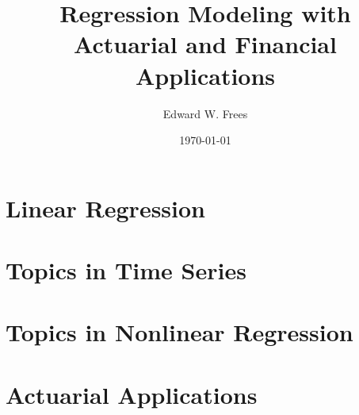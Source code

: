 \documentclass[cup6a]{cupbook}
\title{Regression Modeling with Actuarial and Financial Applications}
\author{Edward W. Frees}
\date{\today}
\begin{document}
\setlength{\marginparwidth}{1in}
\setlength{\marginparsep}{0.25in}


 \maketitle


\tableofcontents



\part{Linear Regression}






\part{Topics in Time Series}





\part{Topics in Nonlinear Regression}






\part{Actuarial Applications}












\printindex
\end{document}
